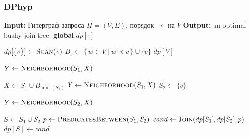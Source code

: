 \subsubsection{DPhyp}


\begin{algorithm}[H]
  \caption{DPhyp}
  \begin{algorithmic}[1]
    \State \textbf{Input:} Гиперграф запроса $H=(V,E)$, порядок $\prec$ на $V$
    \State \textbf{Output:} an optimal bushy join tree.
    \State \textbf{global} $dp[\cdot]$

        \State $dp[\{v\}] \gets \Call{Scan}{v}$
      \EndFor
        \State {}
        \State $B_v \gets \{\,w \in V \mid w \prec v\,\} \cup \{v\}$
        \State {}
      \EndFor
      \State \Return $dp[V]$
    \EndFunction

      \State $Y \gets \Call{Neighborhood}{S_1, X}$
          \State {}
          \State {}
        \EndIf
      \EndFor
    \EndFunction

      \State $X \gets S_1 \cup B_{\min(S_1)}$
      \State $Y \gets \Call{Neighborhood}{S_1, X}$
        \State $S_2 \gets \{v\}$
          \State {}
        \EndIf
        \State {}
      \EndFor
    \EndFunction
  \end{algorithmic}
\end{algorithm}

\begin{algorithm}[H]
  \ContinuedFloat      %
  \caption{DPhyp}
  \begin{algorithmic}[1]
      \State $Y \gets \Call{Neighborhood}{S_2, X}$
          \State {}
        \EndIf
        \State {}
      \EndFor
    \EndFunction

      \State $S \gets S_1 \cup S_2$
      \State $p \gets \Call{PredicatesBetween}{S_1, S_2}$
      \State $cand \gets \Call{Join}{dp[S_1], dp[S_2], p}$
        \State $dp[S] \gets cand$
      \EndIf
    \EndFunction
  \end{algorithmic}
\end{algorithm}

